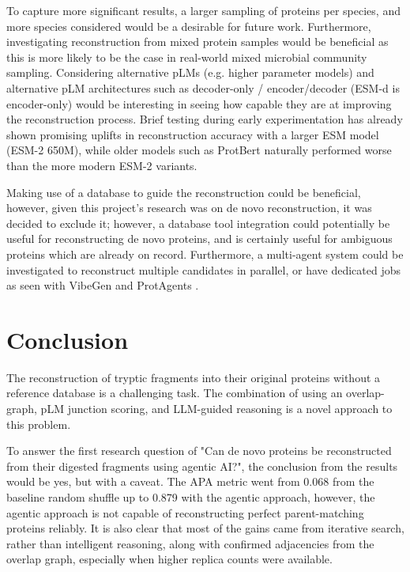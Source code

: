 \documentclass[journal]{IEEEtran}
\begin{document}
To capture more significant results, a larger sampling of proteins per species, and
more species considered would be a desirable for future work. Furthermore, investigating reconstruction from mixed protein samples
would be beneficial as this is more likely to be the case in real-world mixed microbial community sampling. Considering alternative pLMs (e.g. higher parameter models) and
alternative pLM architectures such as decoder-only / encoder/decoder (ESM-d is encoder-only) would be interesting in seeing how capable they
are at improving the reconstruction process. Brief testing during
early experimentation has already shown promising uplifts in reconstruction accuracy with a larger ESM model (ESM-2 650M), while older models such as ProtBert naturally performed
worse than the more modern ESM-2 variants.

Making use of a database to guide the reconstruction could be beneficial, however, given this project's research was on
de novo reconstruction, it was decided to exclude it; however, a database tool integration could potentially be useful
for reconstructing de novo proteins, and is certainly useful for ambiguous proteins which are already on record.
Furthermore, a multi-agent system could be investigated to reconstruct multiple candidates in parallel, or have
dedicated jobs as seen with VibeGen \cite{ni2025agenticendtoendnovoprotein} and ProtAgents \cite{ghafarollahi2024protagentsproteindiscoverylarge}.

\section{Conclusion}

The reconstruction of tryptic fragments into their original proteins without a reference database is a challenging task.
The combination of using an overlap-graph, pLM junction scoring, and LLM-guided reasoning is a novel approach to this problem.

To answer the first research question of "Can de novo proteins be reconstructed from their digested fragments
using agentic AI?", the conclusion from the results would be yes, but with a caveat. The APA metric went from 0.068 from the baseline random shuffle up to
0.879 with the agentic approach, however, the agentic approach is not capable of reconstructing perfect parent-matching proteins reliably. 
It is also clear that most of the gains came from iterative search, rather than
intelligent reasoning, along with confirmed adjacencies from the overlap graph, especially when higher replica counts were available.
\end{document}
